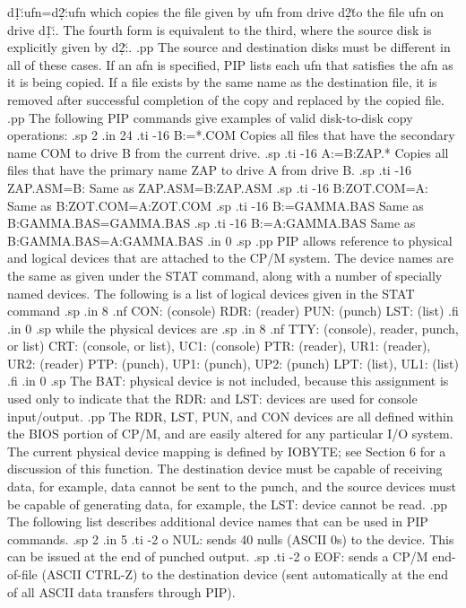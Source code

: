 d\d1\u:ufn=d\d2\u:ufn which copies the file given by ufn from drive 
d\d2\u to the file ufn on drive d\d1\u:.  The fourth form is equivalent to 
the third, where the source disk is explicitly given by d\d2\u:.
.pp
The source and destination disks must be different in all of these cases.  
If an afn is specified, PIP lists each ufn that satisfies the afn as it 
is being copied.  If a file exists by the same name as the destination file, 
it is removed after successful completion of the copy and replaced by the 
copied file.
.pp
The following PIP commands give examples of valid disk-to-disk copy operations:
.sp 2
.in 24
.ti -16
B:=*.COM        Copies all files that have the secondary name COM to
drive B from the current drive.
.sp
.ti -16
A:=B:ZAP.*      Copies all files that have the primary name ZAP to 
drive A from drive B.
.sp
.ti -16
ZAP.ASM=B:      Same as ZAP.ASM=B:ZAP.ASM
.sp
.ti -16
B:ZOT.COM=A:    Same as B:ZOT.COM=A:ZOT.COM
.sp
.ti -16
B:=GAMMA.BAS    Same as B:GAMMA.BAS=GAMMA.BAS
.sp
.ti -16
B:=A:GAMMA.BAS  Same as B:GAMMA.BAS=A:GAMMA.BAS
.in 0
.sp
.pp
PIP allows reference to physical and logical devices that are attached to the
CP/M system.  The device names are the same as given under the STAT command, 
along with a number of specially named devices.  The following is 
a list of logical devices given in the STAT command 
.sp
.in 8
.nf
CON: (console) 
RDR: (reader) 
PUN: (punch) 
LST: (list)
.fi
.in 0
.sp
while the physical devices are
.sp
.in 8
.nf
TTY: (console), reader, punch, or list)
CRT: (console, or list), UC1: (console)
PTR: (reader), UR1: (reader), UR2: (reader)
PTP: (punch), UP1: (punch), UP2: (punch)
LPT: (list), UL1: (list)
.fi
.in 0
.sp
The BAT: physical device is not included, because this assignment is used
only to indicate that the RDR: and LST: devices are used for console 
input/output.
.pp
The RDR, LST, PUN, and CON devices are all defined within the BIOS portion of
CP/M, and are easily altered for any particular I/O system.  The current 
physical device mapping is defined by IOBYTE; see Section 6 for a discussion
of this function.  The destination device must be capable of 
receiving data, for example, data cannot be sent to the punch, and the 
source devices must be 
capable of generating data, for example, the LST: device cannot be read.
.pp
The following list describes additional device names that can be used in 
PIP commands. 
.sp 2
.in 5
.ti -2
o NUL: sends 40 nulls (ASCII 0s) to the device.  This can be issued
at the end of punched output.
.sp
.ti -2
o EOF: sends a CP/M end-of-file (ASCII CTRL-Z) to the destination 
device (sent automatically at the end of all ASCII data transfers through PIP).
